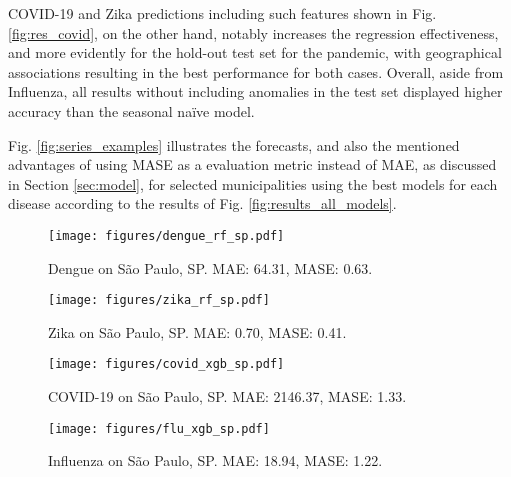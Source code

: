 COVID-19 and Zika predictions including such features shown in Fig. \ref{fig:res_covid}, on the other hand, notably increases the regression effectiveness, and more evidently for the hold-out test set for the pandemic, with geographical associations resulting in the best performance for both cases. Overall, aside from Influenza, all results without including anomalies in the test set displayed higher accuracy than the seasonal naïve model. 

Fig. \ref{fig:series_examples} illustrates the forecasts, and also the mentioned advantages of using MASE as a evaluation metric instead of MAE, as discussed in Section \ref{sec:model}, for selected municipalities using the best models for each disease according to the results of Fig. \ref{fig:results_all_models}. 


\begin{figure*}
    \caption{\label{fig:series_examples} Example predictions for three sample cities for both diseases, using the geographic distances as the aggregation method on the train set and including three new features from associated cities. From left to right: Dengue, Zika, COVID-19 and Influenza cases. None of these time series contain anomalous patterns in the hold-out test set. MAE and MASE results are presented for the test set.}
	\begin{subfigure}[t]{0.22\textwidth}
		\texttt{[image: figures/dengue\_rf\_sp.pdf]}
		\caption{Dengue on São Paulo, SP. MAE: 64.31, MASE: 0.63.}
	\end{subfigure}
    \begin{subfigure}[t]{0.22\textwidth}
		\texttt{[image: figures/zika\_rf\_sp.pdf]}
		\caption{Zika on São Paulo, SP. MAE: 0.70, MASE: 0.41.}
	\end{subfigure}
	\begin{subfigure}[t]{0.22\textwidth}
		\texttt{[image: figures/covid\_xgb\_sp.pdf]}
		\caption{COVID-19 on São Paulo, SP. MAE: 2146.37, MASE: 1.33.}
	\end{subfigure}
    \begin{subfigure}[t]{0.22\textwidth}
		\texttt{[image: figures/flu\_xgb\_sp.pdf]}
		\caption{Influenza on São Paulo, SP. MAE: 18.94, MASE: 1.22.}
	\end{subfigure}
	

\end{figure*}
